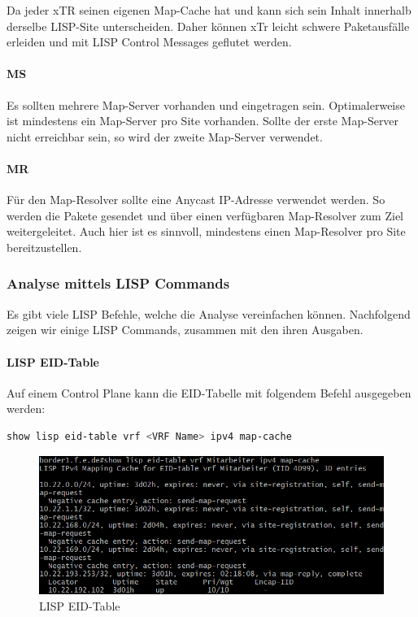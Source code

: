 Da jeder xTR seinen eigenen Map-Cache hat und kann sich sein Inhalt innerhalb derselbe LISP-Site unterscheiden. Daher können xTr leicht schwere Paketausfälle erleiden und mit LISP Control Messages geflutet werden.  

\paragraph{MS}
Es sollten mehrere Map-Server vorhanden und eingetragen sein. Optimalerweise ist mindestens ein Map-Server pro Site vorhanden. Sollte der erste Map-Server nicht erreichbar sein, so wird der zweite Map-Server verwendet.

\paragraph{MR}
Für den Map-Resolver sollte eine Anycast IP-Adresse verwendet werden. So werden die Pakete gesendet und über einen verfügbaren Map-Resolver zum Ziel weitergeleitet. Auch hier ist es sinnvoll, mindestens einen Map-Resolver pro Site bereitzustellen.

\subsubsection{Analyse mittels LISP Commands}
Es gibt viele LISP Befehle, welche die Analyse vereinfachen können. Nachfolgend zeigen wir einige LISP Commands, zusammen mit den ihren Ausgaben. \cite{lisp-commands}

\paragraph{LISP EID-Table}
Auf einem Control Plane kann die EID-Tabelle mit folgendem Befehl ausgegeben werden:

\begin{lstlisting}[language=bash]
show lisp eid-table vrf <VRF Name> ipv4 map-cache
\end{lstlisting}


\begin{figure}[H]
	\centering
	\includegraphics[width=0.8\linewidth]{img/Absicherung/lisp_eid-table}
	\caption{LISP EID-Table}
	\label{fig:LISP EID-Table}
\end{figure}




